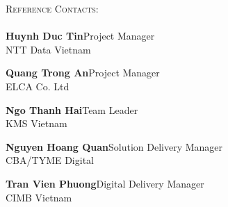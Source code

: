 \documentclass[a4paper]{article}
\newcommand{\lineunder} {
    \vspace*{-8pt} \\
    \hspace*{-18pt} \hrulefill \\
}
\newcommand{\header} [1] {
    {\hspace*{-18pt}\vspace*{6pt} \textsc{#1}}
    \vspace*{-6pt} \lineunder
}
\begin{document}
\header{Reference Contacts:}

\textbf{Huynh Duc Tin}\hfill Project Manager\\
NTT Data Vietnam \hfill %
\vspace{2mm}

\textbf{Quang Trong An}\hfill Project Manager\\
ELCA Co. Ltd \hfill %
\vspace{2mm}

\textbf{Ngo Thanh Hai}\hfill Team Leader\\
KMS Vietnam \hfill %
\vspace{2mm}

\textbf{Nguyen Hoang Quan}\hfill Solution Delivery Manager\\
CBA/TYME Digital \hfill %
\vspace{2mm}

\textbf{Tran Vien Phuong}\hfill Digital Delivery Manager\\
CIMB Vietnam \hfill %
\end{document}
